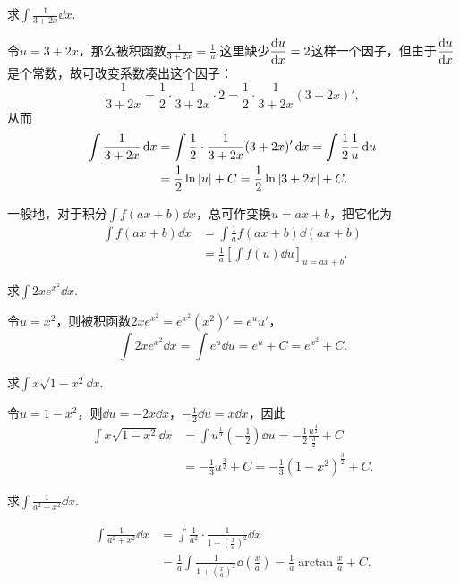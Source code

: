 \begin{example}
求\(\int \frac{1}{3+2x} \dd{x}\).
\begin{solution}
令\(u = 3+2x\)，那么被积函数\(\frac{1}{3+2x} = \frac{1}{u}\).这里缺少\(\displaystyle\dv{u}{x}=2\)这样一个因子，但由于\(\displaystyle\dv{u}{x}\)是个常数，故可改变系数凑出这个因子：\[
\frac{1}{3+2x} = \frac{1}{2} \cdot \frac{1}{3+2x} \cdot 2 = \frac{1}{2} \cdot \frac{1}{3+2x} (3+2x)',
\]从而\begin{align*}
\int \frac{1}{3+2x} \dd{x}
&= \int \frac{1}{2} \cdot \frac{1}{3+2x} (3+2x)' \dd{x}
= \int \frac{1}{2} \frac{1}{u} \dd{u} \\
&= \frac{1}{2} \ln\abs{u} + C
= \frac{1}{2} \ln\abs{3+2x} + C.
\end{align*}
\end{solution}
\end{example}

一般地，对于积分\(\int f(ax+b) \dd{x}\)，总可作变换\(u=ax+b\)，把它化为\begin{align*}
\int f(ax+b) \dd{x}
&= \int \frac{1}{a} f(ax+b) \dd(ax+b) \\
&= \frac{1}{a} \left[ \int f(u) \dd{u} \right]_{u=ax+b}.
\end{align*}

\begin{example}
求\(\int 2x e^{x^2} \dd{x}\).
\begin{solution}
令\(u=x^2\)，则被积函数\(2x e^{x^2} = e^{x^2} (x^2)' = e^u u'\)，\[
\int 2x e^{x^2} \dd{x}
= \int e^u \dd{u}
= e^u + C
= e^{x^2} + C.
\]
\end{solution}
\end{example}

\begin{example}
求\(\int x \sqrt{1-x^2} \dd{x}\).
\begin{solution}
令\(u=1-x^2\)，则\(\dd{u} = -2x\dd{x}\)，\(-\frac{1}{2}\dd{u} = x\dd{x}\)，因此\begin{align*}
\int x \sqrt{1-x^2} \dd{x}
&= \int u^{\frac{1}{2}} \left(-\frac{1}{2}\right) \dd{u}
= -\frac{1}{2} \frac{u^{\frac{3}{2}}}{\frac{3}{2}} + C \\
&= -\frac{1}{3} u^{\frac{3}{2}} + C
= -\frac{1}{3} (1-x^2)^{\frac{3}{2}} + C.
\end{align*}
\end{solution}
\end{example}

\begin{example}
求\(\int \frac{1}{a^2+x^2} \dd{x}\).
\begin{solution}
\begin{align*}
\int \frac{1}{a^2+x^2} \dd{x}
&= \int \frac{1}{a^2} \cdot \frac{1}{1+\left(\frac{x}{a}\right)^2} \dd{x} \\
&= \frac{1}{a} \int \frac{1}{1+\left(\frac{x}{a}\right)^2} \dd(\frac{x}{a})
= \frac{1}{a} \arctan\frac{x}{a} + C.
\end{align*}
\end{solution}
\end{example}

